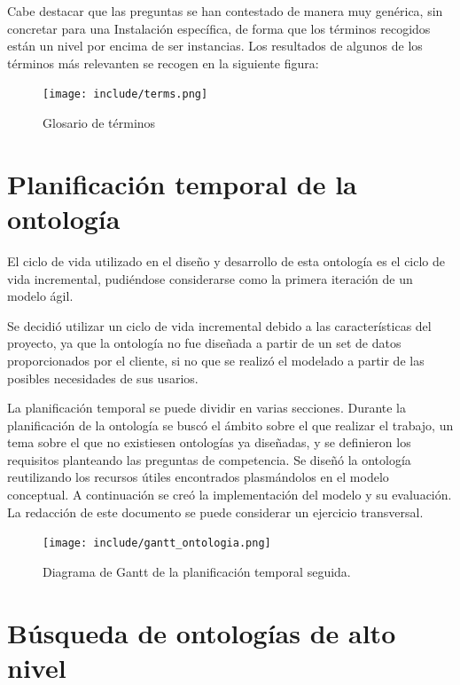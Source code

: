 \documentclass[a4paper,12pt]{article}
\begin{document}
	Cabe destacar que las preguntas se han contestado de manera muy genérica, sin concretar para una Instalación específica, de forma que los términos recogidos están un nivel por encima de ser instancias. Los resultados de algunos de los términos más relevanten se recogen en la siguiente figura: 

	\begin{figure}[H]
		\centering
		\texttt{[image: include/terms.png]}
		\caption{Glosario de términos}		
	\end{figure}
	
	\section{Planificación temporal de la ontología}
		
	El ciclo de vida utilizado en el diseño y desarrollo de esta ontología es el ciclo de vida incremental, pudiéndose considerarse como la primera iteración de un modelo ágil.
	
	Se decidió utilizar un ciclo de vida incremental debido a las características del proyecto, ya que la ontología no fue diseñada a partir de un set de datos proporcionados por el cliente, si no que se realizó el modelado a partir de las posibles necesidades de sus usarios. 
	
	La planificación temporal se puede dividir en varias secciones. Durante la planificación de la ontología se buscó el ámbito sobre el que realizar el trabajo, un tema sobre el que no existiesen ontologías ya diseñadas, y se definieron los requisitos planteando las preguntas de competencia. Se diseñó la ontología reutilizando los recursos útiles encontrados plasmándolos en el modelo conceptual. A continuación se creó la implementación del modelo y su evaluación. La redacción de este documento se puede considerar un ejercicio transversal.
	
	\begin{figure}[H]
		\centering
		\texttt{[image: include/gantt\_ontologia.png]}
		\caption{Diagrama de Gantt de la planificación temporal seguida.}
	\end{figure}
	
	\section{Búsqueda de ontologías de alto nivel}
	
\end{document}
